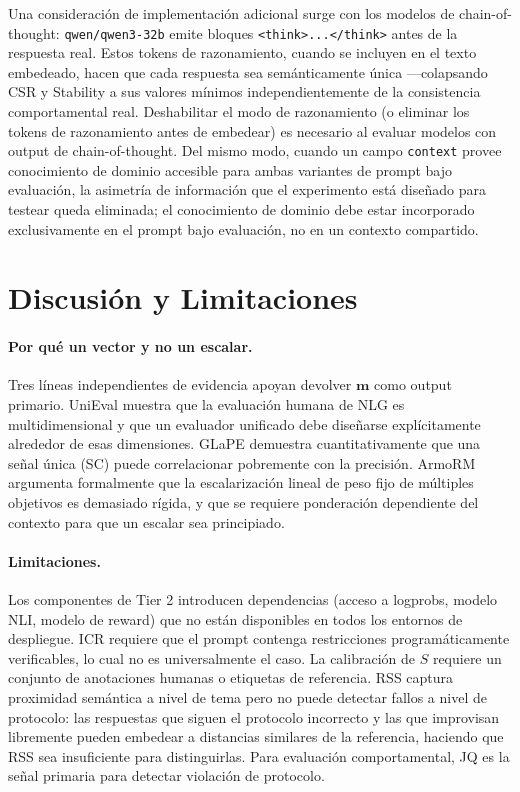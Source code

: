 \documentclass[11pt,a4paper]{article}
\begin{document}
Una consideración de implementación adicional surge con los modelos de chain-of-thought: \texttt{qwen/qwen3-32b} emite bloques \texttt{<think>...</think>} antes de la respuesta real. Estos tokens de razonamiento, cuando se incluyen en el texto embedeado, hacen que cada respuesta sea semánticamente única ---colapsando CSR y Stability a sus valores mínimos independientemente de la consistencia comportamental real. Deshabilitar el modo de razonamiento (o eliminar los tokens de razonamiento antes de embedear) es necesario al evaluar modelos con output de chain-of-thought. Del mismo modo, cuando un campo \texttt{context} provee conocimiento de dominio accesible para ambas variantes de prompt bajo evaluación, la asimetría de información que el experimento está diseñado para testear queda eliminada; el conocimiento de dominio debe estar incorporado exclusivamente en el prompt bajo evaluación, no en un contexto compartido.

\section{Discusión y Limitaciones}
\label{sec:discussion}

\paragraph{Por qué un vector y no un escalar.}
Tres líneas independientes de evidencia apoyan devolver $\mathbf{m}$ como output primario. UniEval \citep{unieval2022} muestra que la evaluación humana de NLG es multidimensional y que un evaluador unificado debe diseñarse explícitamente alrededor de esas dimensiones. GLaPE \citep{glape2024} demuestra cuantitativamente que una señal única (SC) puede correlacionar pobremente con la precisión. ArmoRM \citep{armorm2024} argumenta formalmente que la escalarización lineal de peso fijo de múltiples objetivos es demasiado rígida, y que se requiere ponderación dependiente del contexto para que un escalar sea principiado.

\paragraph{Limitaciones.}
Los componentes de Tier 2 introducen dependencias (acceso a logprobs, modelo NLI, modelo de reward) que no están disponibles en todos los entornos de despliegue. ICR requiere que el prompt contenga restricciones programáticamente verificables, lo cual no es universalmente el caso. La calibración de $S$ requiere un conjunto de anotaciones humanas o etiquetas de referencia. RSS captura proximidad semántica a nivel de tema pero no puede detectar fallos a nivel de protocolo: las respuestas que siguen el protocolo incorrecto y las que improvisan libremente pueden embedear a distancias similares de la referencia, haciendo que RSS sea insuficiente para distinguirlas. Para evaluación comportamental, JQ es la señal primaria para detectar violación de protocolo.
\end{document}
